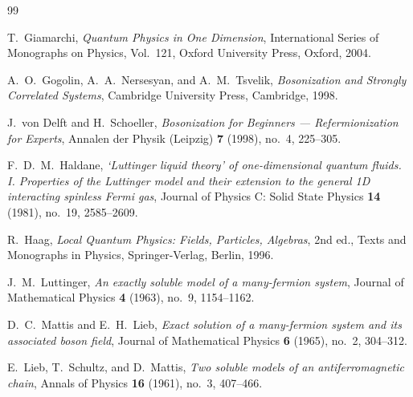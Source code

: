 \begin{thebibliography}{99}

T.~Giamarchi, \emph{Quantum Physics in One Dimension}, International Series of Monographs on Physics, Vol.~121, Oxford University Press, Oxford, 2004.

A.~O.~Gogolin, A.~A.~Nersesyan, and A.~M.~Tsvelik, \emph{Bosonization and Strongly Correlated Systems}, Cambridge University Press, Cambridge, 1998.

J.~von Delft and H.~Schoeller, \emph{Bosonization for Beginners --- Refermionization for Experts}, Annalen der Physik (Leipzig) \textbf{7} (1998), no.~4, 225--305.

F.~D.~M.~Haldane, \emph{`Luttinger liquid theory' of one-dimensional quantum fluids. I. Properties of the Luttinger model and their extension to the general 1D interacting spinless Fermi gas}, Journal of Physics C: Solid State Physics \textbf{14} (1981), no.~19, 2585--2609.

R.~Haag, \emph{Local Quantum Physics: Fields, Particles, Algebras}, 2nd ed., Texts and Monographs in Physics, Springer-Verlag, Berlin, 1996.

J.~M.~Luttinger, \emph{An exactly soluble model of a many-fermion system}, Journal of Mathematical Physics \textbf{4} (1963), no.~9, 1154--1162.

D.~C.~Mattis and E.~H.~Lieb, \emph{Exact solution of a many-fermion system and its associated boson field}, Journal of Mathematical Physics \textbf{6} (1965), no.~2, 304--312.

E.~Lieb, T.~Schultz, and D.~Mattis, \emph{Two soluble models of an antiferromagnetic chain}, Annals of Physics \textbf{16} (1961), no.~3, 407--466.

\end{thebibliography}
